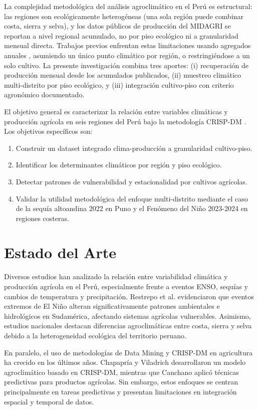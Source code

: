\documentclass[conference]{IEEEtran}
\begin{document}
La complejidad metodológica del análisis agroclimático en el Perú es estructural: las regiones son ecológicamente heterogéneas (una sola región puede combinar costa, sierra y selva), y los datos públicos de producción del MIDAGRI se reportan a nivel regional acumulado, no por piso ecológico ni a granularidad mensual directa. Trabajos previos enfrentan estas limitaciones usando agregados anuales \cite{senamhi2009, unap2016}, asumiendo un único punto climático por región, o restringiéndose a un solo cultivo. La presente investigación combina tres aportes: (i) recuperación de producción mensual desde los acumulados publicados, (ii) muestreo climático multi-distrito por piso ecológico, y (iii) integración cultivo-piso con criterio agronómico documentado.

El objetivo general es caracterizar la relación entre variables climáticas y producción agrícola en seis regiones del Perú bajo la metodología CRISP-DM \cite{inia2019}. Los objetivos específicos son: 
\begin{enumerate}
    \item Construir un dataset integrado clima-producción a granularidad cultivo-piso.
    \item Identificar los determinantes climáticos por región y piso ecológico.
    \item Detectar patrones de vulnerabilidad y estacionalidad por cultivos agrícolas.
    \item Validar la utilidad metodológica del enfoque multi-distrito mediante el caso de la sequía altoandina 2022 en Puno y el Fenómeno del Niño 2023-2024 en regiones costeras.
\end{enumerate}

\section{Estado del Arte}
Diversos estudios han analizado la relación entre variabilidad climática y producción agrícola en el Perú, especialmente frente a eventos ENSO, sequías y cambios de temperatura y precipitación. Restrepo et al. \cite{restrepo2017} evidenciaron que eventos extremos de El Niño alteran significativamente patrones ambientales e hidrológicos en Sudamérica, afectando sistemas agrícolas vulnerables. Asimismo, estudios nacionales destacan diferencias agroclimáticas entre costa, sierra y selva debido a la heterogeneidad ecológica del territorio peruano.

En paralelo, el uso de metodologías de Data Mining y CRISP-DM en agricultura ha crecido en los últimos años. Chapapría y Viladrich \cite{chapapria2024} desarrollaron un modelo agroclimático basado en CRISP-DM, mientras que Canchano \cite{canchano2024} aplicó técnicas predictivas para productos agrícolas. Sin embargo, estos enfoques se centran principalmente en tareas predictivas y presentan limitaciones en integración espacial y temporal de datos.
\end{document}

